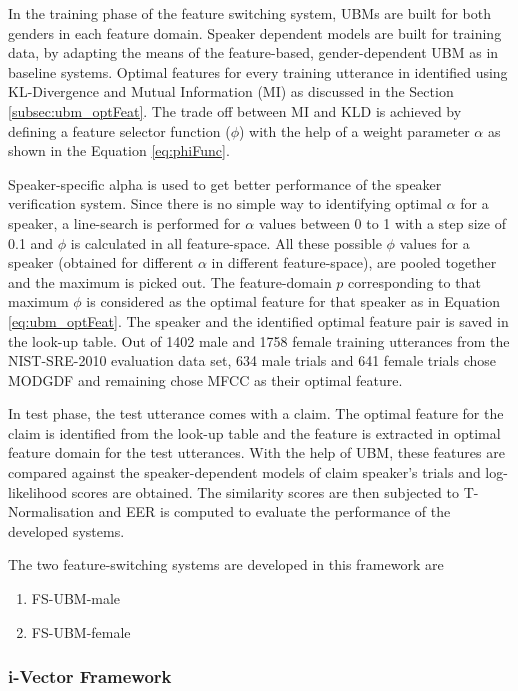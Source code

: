 \documentclass{article}
\begin{document}
In the training phase of the feature switching system, UBMs are built for both genders in each feature domain. Speaker dependent models are built for training data, by adapting the means of the feature-based, gender-dependent UBM as in baseline systems. Optimal features for every training utterance in identified using KL-Divergence and Mutual Information (MI) as  discussed in the Section \ref{subsec:ubm_optFeat}. The trade off between MI and KLD is achieved by defining a feature selector function ($\phi$) with the help of a weight parameter $\alpha$ as shown in the Equation \ref{eq:phiFunc}. 

Speaker-specific alpha is used to get better performance of the speaker verification system. Since there is no simple way to identifying optimal $\alpha$ for a speaker, a line-search is performed for $\alpha$ values between 0 to 1 with a step size of 0.1 and $\phi$ is calculated in all feature-space. All these possible $\phi$ values for a speaker (obtained for different $\alpha$ in different feature-space), are pooled together and the maximum is picked out. The feature-domain $p$ corresponding to that maximum $\phi$ is considered as the optimal feature for that speaker as in Equation \ref{eq:ubm_optFeat}. The speaker and the identified optimal feature pair is saved in the look-up table. Out of 1402 male  and 1758 female training utterances from the NIST-SRE-2010 evaluation data set, 634 male trials and 641 female trials chose MODGDF and remaining chose MFCC as their optimal feature.

In test phase, the test utterance comes with a claim. The optimal feature for the claim is identified from the look-up table and the feature is extracted in optimal feature domain for the test utterances. With the help of UBM, these features are compared against the speaker-dependent models of claim speaker's trials and log-likelihood scores are obtained. The similarity scores are then subjected to T-Normalisation and EER is computed to evaluate the performance of the developed systems. 

The two feature-switching systems are developed in this framework are
\begin{enumerate}
\item FS-UBM-male 
\item FS-UBM-female
\end{enumerate}


\subsubsection{i-Vector Framework}
\label{subsubsec:fs_ivec} 
\end{document}
